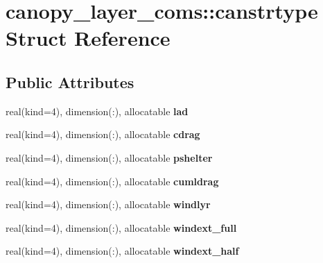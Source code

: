 \hypertarget{structcanopy__layer__coms_1_1canstrtype}{
\section{canopy\_\-layer\_\-coms::canstrtype Struct Reference}
\label{structcanopy__layer__coms_1_1canstrtype}
}
\subsection*{Public Attributes}
\begin{DoxyCompactItemize}
\item 
\hypertarget{structcanopy__layer__coms_1_1canstrtype_a00c2943136956504e1c10e851fc91fe5}{
real(kind=4), dimension(:), allocatable {\bfseries lad}}
\label{structcanopy__layer__coms_1_1canstrtype_a00c2943136956504e1c10e851fc91fe5}

\item 
\hypertarget{structcanopy__layer__coms_1_1canstrtype_a597059963066776d1f9a636da2cd7287}{
real(kind=4), dimension(:), allocatable {\bfseries cdrag}}
\label{structcanopy__layer__coms_1_1canstrtype_a597059963066776d1f9a636da2cd7287}

\item 
\hypertarget{structcanopy__layer__coms_1_1canstrtype_acc44959bacce563db7acbd76e34cd65b}{
real(kind=4), dimension(:), allocatable {\bfseries pshelter}}
\label{structcanopy__layer__coms_1_1canstrtype_acc44959bacce563db7acbd76e34cd65b}

\item 
\hypertarget{structcanopy__layer__coms_1_1canstrtype_a6938b77bbc62543428ee22bebe2d9b8d}{
real(kind=4), dimension(:), allocatable {\bfseries cumldrag}}
\label{structcanopy__layer__coms_1_1canstrtype_a6938b77bbc62543428ee22bebe2d9b8d}

\item 
\hypertarget{structcanopy__layer__coms_1_1canstrtype_a6e72b98ba90b8c970c01b5ec241eee0e}{
real(kind=4), dimension(:), allocatable {\bfseries windlyr}}
\label{structcanopy__layer__coms_1_1canstrtype_a6e72b98ba90b8c970c01b5ec241eee0e}

\item 
\hypertarget{structcanopy__layer__coms_1_1canstrtype_ab2abc894aff596b13cc0e1f8fcc14e6e}{
real(kind=4), dimension(:), allocatable {\bfseries windext\_\-full}}
\label{structcanopy__layer__coms_1_1canstrtype_ab2abc894aff596b13cc0e1f8fcc14e6e}

\item 
\hypertarget{structcanopy__layer__coms_1_1canstrtype_ab518da82682184f8f0dd912e2aedefb2}{
real(kind=4), dimension(:), allocatable {\bfseries windext\_\-half}}
\label{structcanopy__layer__coms_1_1canstrtype_ab518da82682184f8f0dd912e2aedefb2}


\end{DoxyCompactItemize}
